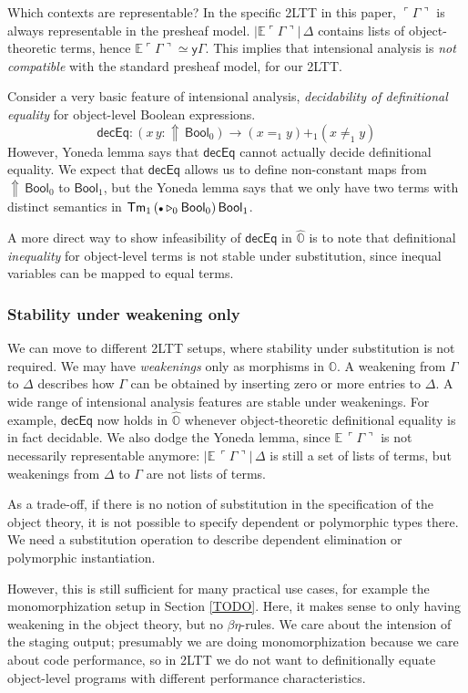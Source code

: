 \documentclass[acmsmall]{acmart}
\newcommand{\msf}[1]{\mathsf{#1}}
\newcommand{\mbb}[1]{\mathbb{#1}}
\newcommand{\ext}{\triangleright}
\newcommand{\Lift}{{\Uparrow}}
\newcommand{\mbbo}{\mbb{O}}
\newcommand{\Tm}{\msf{Tm}}
\newcommand{\Bool}{\msf{Bool}}
\newcommand{\emptycon}{\scaleobj{.75}\bullet}
\newcommand{\emb}[1]{\ulcorner#1\urcorner}
\newcommand{\hato}{\bm\hat{\mbbo}}
\newcommand{\ev}{\mbb{E}}
\theoremstyle{remark}
\newcommand{\yon}{\msf{y}}
\begin{document}
Which contexts are representable? In the specific 2LTT in this paper,
$\emb{\Gamma}$ is always representable in the presheaf
model. $|\ev{\emb{\Gamma}}|\,\Delta$ contains lists of object-theoretic terms,
hence $\ev{\emb{\Gamma}} \simeq \yon \Gamma$.  This implies that intensional
analysis is \emph{not compatible} with the standard presheaf model, for our
2LTT.

Consider a very basic feature of intensional analysis, \emph{decidability of
definitional equality} for object-level Boolean expressions.
\[
  \msf{decEq} : (x\,y : \Lift\,\Bool_0) \to (x =_1 y) +_1 (x \neq_1 y)
\]
However, Yoneda lemma says that $\msf{decEq}$ cannot actually decide
definitional equality. We expect that $\msf{decEq}$ allows us to define
non-constant maps from $\Lift\,\Bool_0$ to $\Bool_1$, but the Yoneda lemma says
that we only have two terms with distinct semantics in $\Tm_1\,(\emptycon \ext_0
\Bool_0)\,\Bool_1$.

A more direct way to show infeasibility of $\msf{decEq}$ in $\hato$ is to note
that definitional \emph{inequality} for object-level terms is not stable under
substitution, since inequal variables can be mapped to equal terms.

\subsubsection{Stability under weakening only}
We can move to different 2LTT setups, where stability under substitution is not
required. We may have \emph{weakenings} only as morphisms in $\mbbo$.  A
weakening from $\Gamma$ to $\Delta$ describes how $\Gamma$ can be obtained by
inserting zero or more entries to $\Delta$. A wide range of intensional analysis
features are stable under weakenings. For example, $\msf{decEq}$ now holds in
$\hato$ whenever object-theoretic definitional equality is in fact decidable.
We also dodge the Yoneda lemma, since $\ev\,\emb{\Gamma}$ is not necessarily
representable anymore: $|\ev\,\emb{\Gamma}|\,\Delta$ is still a set of lists of
terms, but weakenings from $\Delta$ to $\Gamma$ are not lists of terms.

As a trade-off, if there is no notion of substitution in the specification of the
object theory, it is not possible to specify dependent or polymorphic types
there. We need a substitution operation to describe dependent elimination or
polymorphic instantiation.

However, this is still sufficient for many practical use cases, for example the
monomorphization setup in Section \ref{TODO}. Here, it makes sense to only
having weakening in the object theory, but no $\beta\eta$-rules. We care about
the intension of the staging output; presumably we are doing monomorphization
because we care about code performance, so in 2LTT we do not want to
definitionally equate object-level programs with different performance
characteristics.
\end{document}
